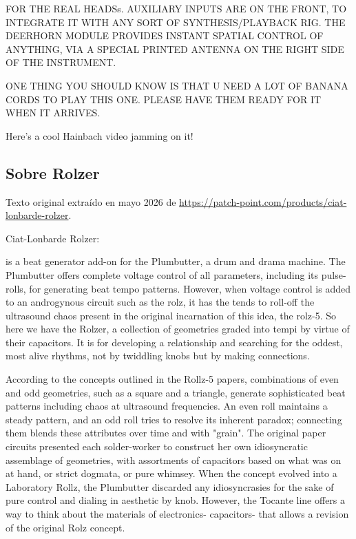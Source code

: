FOR THE REAL HEADSs. AUXILIARY INPUTS ARE ON THE FRONT, TO INTEGRATE IT WITH ANY SORT OF SYNTHESIS/PLAYBACK RIG. THE DEERHORN MODULE PROVIDES INSTANT SPATIAL CONTROL OF ANYTHING, VIA A SPECIAL PRINTED ANTENNA ON THE RIGHT SIDE OF THE INSTRUMENT. 

ONE THING YOU SHOULD KNOW IS THAT U NEED A LOT OF BANANA CORDS TO PLAY THIS ONE. PLEASE HAVE THEM READY FOR IT WHEN IT ARRIVES.

Here's a cool Hainbach video jamming on it!

\newpage

\subsection{Sobre Rolzer}

Texto original extraído en mayo 2026 de \url{https://patch-point.com/products/ciat-lonbarde-rolzer}.

Ciat-Lonbarde Rolzer:

is a beat generator add-on for the Plumbutter, a drum and drama machine. The Plumbutter offers complete voltage control of all parameters, including its pulse-rolls, for generating beat tempo patterns. However, when voltage control is added to an androgynous circuit such as the rolz, it has the tends to roll-off the ultrasound chaos present in the original incarnation of this idea, the rolz-5. So here we have the Rolzer, a collection of geometries graded into tempi by virtue of their capacitors. It is for developing a relationship and searching for the oddest, most alive rhythms, not by twiddling knobs but by making connections.

According to the concepts outlined in the Rollz-5 papers, combinations of even and odd geometries, such as a square and a triangle, generate sophisticated beat patterns including chaos at ultrasound frequencies. An even roll maintains a steady pattern, and an odd roll tries to resolve its inherent paradox; connecting them blends these attributes over time and with "grain". The original paper circuits presented each solder-worker to construct her own idiosyncratic assemblage of geometries, with assortments of capacitors based on what was on at hand, or strict dogmata, or pure whimsey. When the concept evolved into a Laboratory Rollz, the Plumbutter discarded any idiosyncrasies for the sake of pure control and dialing in aesthetic by knob. However, the Tocante line offers a way to think about the materials of electronics- capacitors- that allows a revision of the original Rolz concept.

